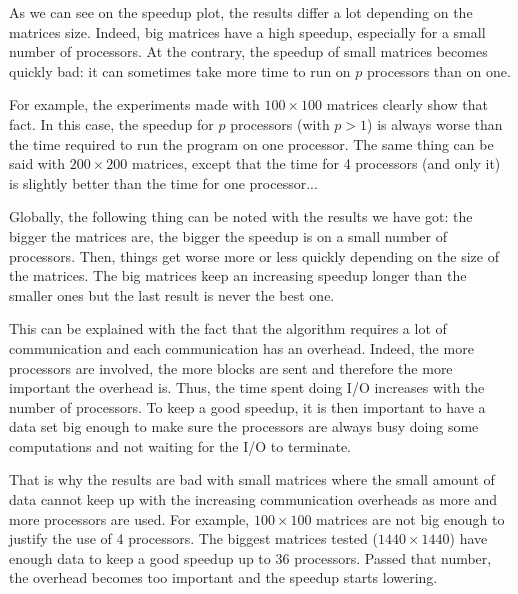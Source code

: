 As we can see on the speedup plot, the results differ a lot depending on the matrices size. Indeed, big matrices have a high speedup, especially for a small number of processors. At the contrary, the speedup of small matrices becomes quickly bad: it can sometimes take more time to run on $p$ processors than on one.


For example, the experiments made with $100 \times 100$ matrices clearly show that fact. In this case, the speedup for $p$ processors (with $p > 1$) is always worse than the time required to run the program on one processor. The same thing can be said with $200 \times 200$ matrices, except that the time for 4 processors (and only it) is slightly better than the time for one processor...


Globally, the following thing can be noted with the results we have got: the bigger the matrices are, the bigger the speedup is on a small number of processors. Then, things get worse more or less quickly depending on the size of the matrices. The big matrices keep an increasing speedup longer than the smaller ones but the last result is never the best one.


This can be explained with the fact that the algorithm requires a lot of communication and each communication has an overhead. Indeed, the more processors are involved, the more blocks are sent and therefore the more important the overhead is. Thus, the time spent doing I/O increases with the number of processors. To keep a good speedup, it is then important to have a data set big enough to make sure the processors are always busy doing some computations and not waiting for the I/O to terminate.


That is why the results are bad with small matrices where the small amount of data cannot keep up with the increasing communication overheads as more and more processors are used. For example, $100 \times 100$ matrices are not big enough to justify the use of 4 processors. The biggest matrices tested ($1440 \times 1440$) have enough data to keep a good speedup up to 36 processors. Passed that number, the overhead becomes too important and the speedup starts lowering. 
